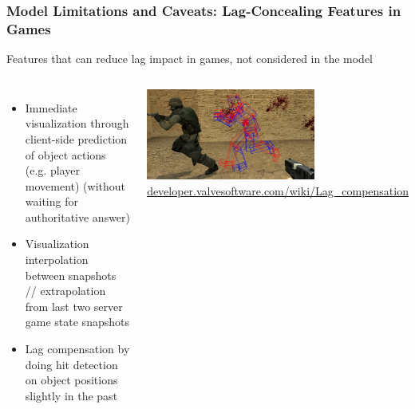 \documentclass{UDEbeamerEN}
\begin{document}
\begin{frame}
	\frametitle{Model Limitations and Caveats: Lag-Concealing Features in Games}

	Features that can reduce lag impact in games, not considered in the model

	\begin{columns}[T]
			\begin{itemize}
				\item Immediate visualization through client-side prediction of object actions (e.g. player movement) (without waiting for authoritative answer)
				\item Visualization interpolation between snapshots // extrapolation from last two server game state snapshots
				\item Lag compensation by doing hit detection on object positions slightly in the past
			\end{itemize}
			\vspace{-1mm}
			\includegraphics[height=3cm]{Lag_compensation.jpg}\\
			{\tiny\url{developer.valvesoftware.com/wiki/Lag_compensation}}
	\end{columns}

\end{frame}
\end{document}
